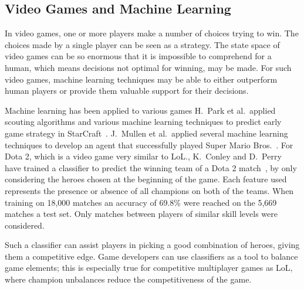 \subsection{Video Games and Machine Learning}\label{sec:mlandonlinevideogames}
In video games, one or more players make a number of choices trying to win. The choices made by a single player can be seen as a strategy. The state space of video games can be so enormous that it is impossible to comprehend for a human, which means decisions not optimal for winning, may be made. For such video games, machine learning techniques may be able to either outperform human players or provide them valuable support for their decisions.

Machine learning has been applied to various games H.\ Park et al.\ applied scouting algorithms and various machine learning techniques to predict early game strategy in StarCraft~\cite{Park:2012:PES:2425296.2425298}. J.\ Mullen et al.\ applied several machine learning techniques to develop an agent that successfully played Super Mario Bros.~\cite{supermario}. For Dota 2, which is a video game very similar to LoL.\@, K.\ Conley and D.\ Perry have trained a classifier to predict the winning team of a Dota 2 match~\cite{dota2article}, by only considering the heroes chosen at the beginning of the game. Each feature used represents the presence or absence of all champions on both of the teams. When training on 18,000 matches an accuracy of 69.8\% were reached on the 5,669 matches a test set. Only matches between players of similar skill levels were considered. 

Such a classifier can assist players in picking a good combination of heroes, giving them a competitive edge. Game developers can use classifiers as a tool to balance game elements; this is especially true for competitive multiplayer games as LoL, where champion unbalances reduce the competitiveness of the game.

%
%



